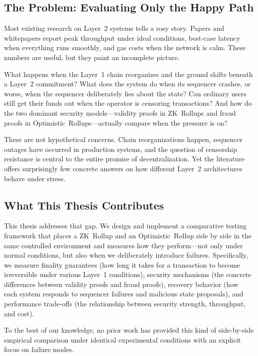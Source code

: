 \subsection{The Problem: Evaluating Only the Happy Path}

Most existing research on Layer~2 systems tells a rosy story. Papers and whitepapers report peak throughput under ideal conditions, best-case latency when everything runs smoothly, and gas costs when the network is calm. These numbers are useful, but they paint an incomplete picture.

What happens when the Layer~1 chain reorganizes and the ground shifts beneath a Layer~2 commitment? What does the system do when its sequencer crashes, or worse, when the sequencer deliberately lies about the state? Can ordinary users still get their funds out when the operator is censoring transactions? And how do the two dominant security models---validity proofs in ZK~Rollups and fraud proofs in Optimistic~Rollups---actually compare when the pressure is on?

These are not hypothetical concerns. Chain reorganizations happen, sequencer outages have occurred in production systems, and the question of censorship resistance is central to the entire promise of decentralization. Yet the literature offers surprisingly few concrete answers on how different Layer~2 architectures behave under stress.

\subsection{What This Thesis Contributes}

This thesis addresses that gap. We design and implement a comparative testing framework that places a ZK~Rollup and an Optimistic~Rollup side by side in the same controlled environment and measures how they perform---not only under normal conditions, but also when we deliberately introduce failures. Specifically, we measure finality guarantees (how long it takes for a transaction to become irreversible under various Layer~1 conditions), security mechanisms (the concrete differences between validity proofs and fraud proofs), recovery behavior (how each system responds to sequencer failures and malicious state proposals), and performance trade-offs (the relationship between security strength, throughput, and cost).

To the best of our knowledge, no prior work has provided this kind of side-by-side empirical comparison under identical experimental conditions with an explicit focus on failure modes.

